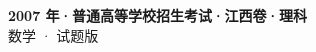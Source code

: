 \documentclass[zihao=-4, a4paper]{ctexart}
\begin{document}
\begin{center}
  {\Large\bfseries 2007 年·普通高等学校招生考试·江西卷·理科}\\[4pt]
  {\large 数学 · 试题版}
\end{center}
\medskip
{}

\end{document}
